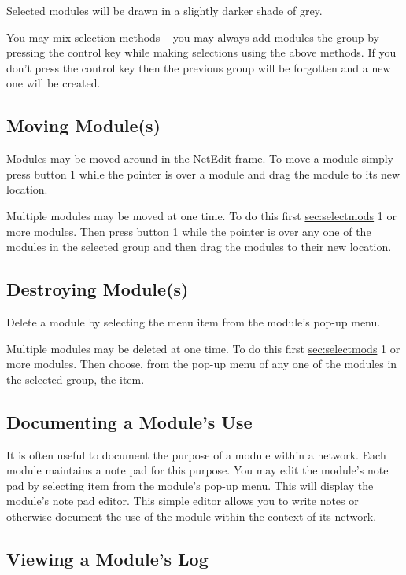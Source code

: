 Selected modules will be drawn in a slightly darker shade of grey.

You may mix selection methods -- you may always add modules the group by
pressing the control key while making selections using the above methods.
If you don't press the control key then the previous group will be
forgotten and a new one will be created.

\subsection{Moving Module(s)}
\label{sec:movemod}

Modules may be moved around in the NetEdit frame.  To move a module simply
press button 1 while the pointer is over a module and drag the module to
its new location.

Multiple modules may be moved at one time.  To do this first
\hyperref{select}{select (see Section~}{)}{sec:selectmods} 1 or more
modules. Then press button 1 while the pointer is over any one of the
modules in the selected group and then drag the modules to their new location.


\subsection{Destroying Module(s)}
\label{sec:destroymod}

Delete a module by selecting the  menu item from the
module's pop-up menu.

Multiple modules may be deleted at one time.  To do this first
\hyperref{select}{select (see Section~}{)}{sec:selectmods} 1 or more
modules. Then choose, from the pop-up menu of any one of the modules in the
selected group, the  item.


\subsection{Documenting a Module's Use}
\label{sec:docmodule}

It is often useful to document the purpose of a module within a network.
Each module maintains a note pad for this purpose.  You may edit the
module's note pad by selecting  item from the module's
pop-up menu.  This will display the module's note pad editor.  This simple
editor allows you to write notes or otherwise document the use of the
module within the context of its network.

\subsection{Viewing a Module's Log}
\label{sec:viewmodslog}

